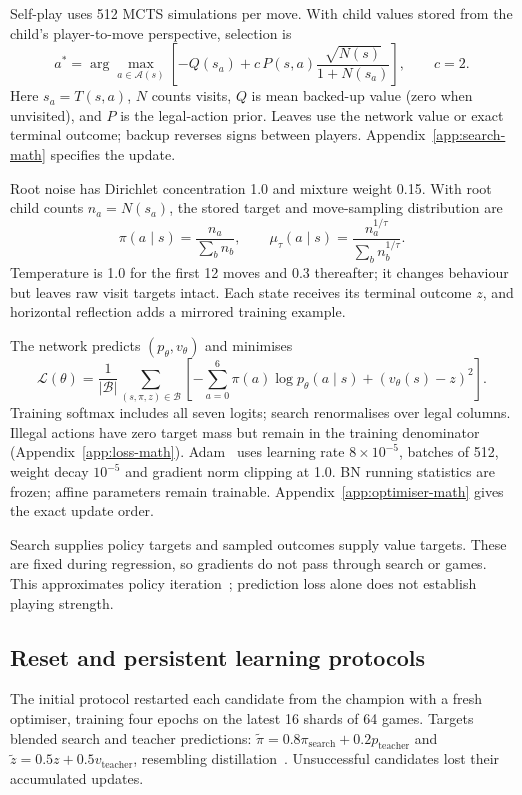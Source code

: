 \documentclass[letterpaper]{article}
\begin{document}
Self-play uses 512 MCTS simulations per move. With child values stored from the
child's player-to-move perspective, selection is
\begin{equation}
 a^*=\arg\max_{a\in\mathcal A(s)}
 \left[-Q(s_a)+c\,P(s,a)\frac{\sqrt{N(s)}}{1+N(s_a)}\right],\qquad c=2.
 \label{eq:puct}
\end{equation}
Here $s_a=T(s,a)$, $N$ counts visits, $Q$ is mean backed-up value (zero when
unvisited), and $P$ is the legal-action prior. Leaves use the network value or
exact terminal outcome; backup reverses signs between players.
Appendix~\ref{app:search-math} specifies the update.

Root noise has Dirichlet concentration 1.0 and mixture weight 0.15. With root
child counts $n_a=N(s_a)$, the stored target and move-sampling distribution are
\begin{equation}
 \pi(a\mid s)=\frac{n_a}{\sum_b n_b},\qquad
 \mu_\tau(a\mid s)=\frac{n_a^{1/\tau}}{\sum_b n_b^{1/\tau}}.
 \label{eq:visits}
\end{equation}
Temperature is 1.0 for the first 12 moves and 0.3 thereafter; it changes behaviour
but leaves raw visit targets intact. Each state receives its terminal outcome
$z$, and horizontal reflection adds a mirrored training example.

The network predicts $(p_\theta,v_\theta)$ and minimises
\begin{equation}
 \mathcal L(\theta)=\frac{1}{|\mathcal B|}\sum_{(s,\pi,z)\in\mathcal B}
 \left[-\sum_{a=0}^{6}\pi(a)\log p_\theta(a\mid s)
       +(v_\theta(s)-z)^2\right].
 \label{eq:data-loss}
\end{equation}
Training softmax includes all seven logits; search renormalises over legal
columns. Illegal actions have zero target mass but remain in the training
denominator (Appendix~\ref{app:loss-math}). Adam~\cite{kingma2015} uses learning
rate $8\times10^{-5}$, batches of 512, weight decay $10^{-5}$ and gradient norm
clipping at 1.0. BN running statistics are frozen; affine parameters remain
trainable. Appendix~\ref{app:optimiser-math} gives the exact update order.

Search supplies policy targets and sampled outcomes supply value targets. These
are fixed during regression, so gradients do not pass through search or games.
This approximates policy iteration~\cite{silver2018,anthony2017}; prediction loss
alone does not establish playing strength.

\subsection{Reset and persistent learning protocols}
The initial protocol restarted each candidate from the champion with a fresh
optimiser, training four epochs on the latest 16 shards of 64 games. Targets
blended search and teacher predictions:
$\tilde\pi=0.8\pi_{\mathrm{search}}+0.2p_{\mathrm{teacher}}$ and
$\tilde z=0.5z+0.5v_{\mathrm{teacher}}$, resembling distillation~\cite{hinton2015}.
Unsuccessful candidates lost their accumulated updates.
\end{document}
